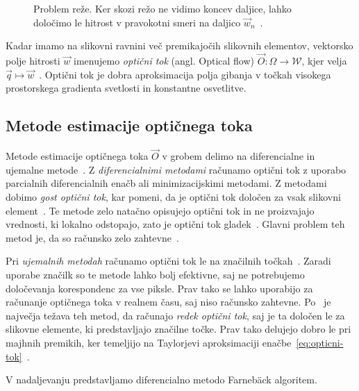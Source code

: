 \begin{figure}[htb]
\centering

\caption[Problem reže]{Problem reže. Ker skozi režo ne vidimo koncev daljice, lahko določimo le hitrost v pravokotni smeri na daljico $\vec{w}_n$~\cite{trucco1998introductory}.}
\label{fig:aperture-problem}
\end{figure}




Kadar imamo na slikovni ravnini več premikajočih slikovnih elementov, vektorsko polje hitrosti $\vec{w}$ imenujemo \emph{optični tok} (angl. Optical flow) $\vec{O}: \varOmega \to \mathcal{W}$, kjer velja $ \vec{q} \mapsto \vec{w}$~\cite{trucco1998introductory}. Optični tok je dobra aproksimacija polja gibanja v točkah visokega prostorskega gradienta svetlosti in konstantne osvetlitve.



\subsection{Metode estimacije optičnega toka}\label{sec:metode-of}

Metode estimacije optičnega toka $\vec{O}$ v grobem delimo na diferencialne in {ujemalne} metode~\cite{trucco1998introductory}. Z \emph{diferencialnimi metodami} računamo optični tok z uporabo parcialnih diferencialnih enačb ali minimizacijskimi metodami. Z metodami dobimo \emph{gost optični tok}, kar pomeni, da je optični tok določen za vsak slikovni element~\cite{trucco1998introductory}. Te metode zelo natačno opisujejo optični tok in ne proizvajajo vrednosti, ki lokalno odstopajo, zato je optični tok gladek~\cite{brox2011large}.  Glavni problem teh metod je, da so računsko zelo zahtevne~\cite{trucco1998introductory}.

Pri \emph{ujemalnih metodah} računamo optični tok le na značilnih točkah~\cite{trucco1998introductory}. Zaradi uporabe značilk so te metode lahko bolj efektivne, saj ne potrebujemo določevanja korespondenc za vse piksle. Prav tako se lahko uporabijo za računanje optičnega toka v realnem času, saj niso računsko zahtevne. Po~\cite{trucco1998introductory} je največja težava teh metod, da računajo \emph{redek optični tok}, saj je ta določen le za slikovne elemente, ki predstavljajo značilne točke. Prav tako delujejo dobro le pri majhnih premikih, ker temeljijo na Taylorjevi aproksimaciji enačbe~\eqref{eq:opticni-tok}~\cite{wedel2011stereo}. 

V nadaljevanju predstavljamo diferencialno metodo Farneb{\"a}ck algoritem.

